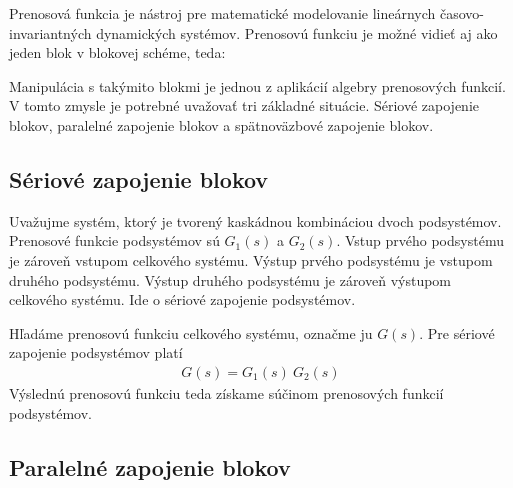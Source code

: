\documentclass[a4paper, 10pt, ]{article}
\begin{document}
Prenosová funkcia je nástroj pre matematické modelovanie lineárnych časovo-invariantných dynamických systémov. Prenosovú funkciu je možné vidieť aj ako jeden blok v blokovej schéme, teda:

\begin{center}

    \makebox[\textwidth][c]{%
    
    }

	\label{TFalgebra_lenG}

\end{center}

Manipulácia s takýmito blokmi je jednou z aplikácií algebry prenosových funkcií. V tomto zmysle je potrebné uvažovať tri základné situácie. Sériové zapojenie blokov, paralelné zapojenie blokov a spätnoväzbové zapojenie blokov.




\subsection{Sériové zapojenie blokov}

Uvažujme systém, ktorý je tvorený kaskádnou kombináciou dvoch podsystémov. Prenosové funkcie podsystémov sú $G_1(s)$ a $G_2(s)$. Vstup prvého podsystému je zároveň vstupom celkového systému. Výstup prvého podsystému je vstupom druhého podsystému. Výstup druhého podsystému je zároveň výstupom celkového systému. Ide o sériové zapojenie podsystémov.

\begin{center}

    \makebox[\textwidth][c]{%
    
    }

	\label{TFalgebra_seriove}

\end{center}

Hľadáme prenosovú funkciu celkového systému, označme ju $G(s)$. Pre sériové zapojenie podsystémov platí
\begin{align}
    G(s) = G_1(s)\ G_2(s)
\end{align}
Výslednú prenosovú funkciu teda získame súčinom prenosových funkcií podsystémov.




\subsection{Paralelné zapojenie blokov}
\end{document}
